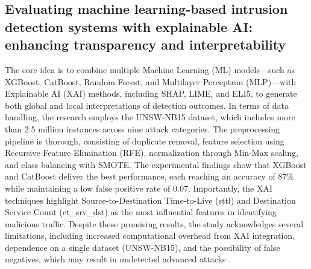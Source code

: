 \documentclass[12pt, a4paper]{article}
\begin{document}
\subsection*{Evaluating machine learning-based intrusion detection systems with explainable AI: enhancing transparency and interpretability}
The core idea is to combine multiple Machine Learning (ML) models—such as XGBoost, CatBoost, Random Forest, and Multilayer Perceptron (MLP)—with Explainable AI (XAI) methods, including SHAP, LIME, and ELI5, to generate both global and local interpretations of detection outcomes. In terms of data handling, the research employs the UNSW-NB15 dataset, which includes more than 2.5 million instances across nine attack categories. The preprocessing pipeline is thorough, consisting of duplicate removal, feature selection using Recursive Feature Elimination (RFE), normalization through Min-Max scaling, and class balancing with SMOTE. The experimental findings show that XGBoost and CatBoost deliver the best performance, each reaching an accuracy of 87\% while maintaining a low false positive rate of 0.07. Importantly, the XAI techniques highlight Source-to-Destination Time-to-Live (sttl) and Destination Service Count (ct\_srv\_dst) as the most influential features in identifying malicious traffic. Despite these promising results, the study acknowledges several limitations, including increased computational overhead from XAI integration, dependence on a single dataset (UNSW-NB15), and the possibility of false negatives, which may result in undetected advanced attacks \cite{ML_based_NIDS_XAI}.
\end{document}
